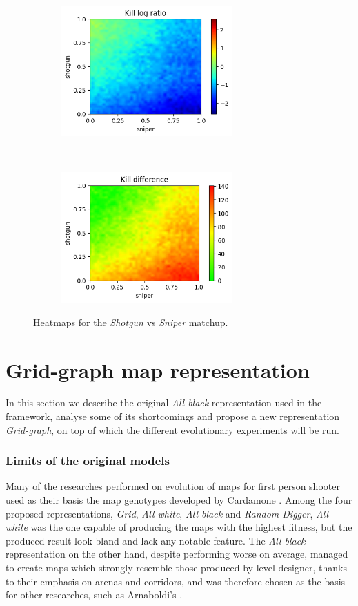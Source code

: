 \begin{figure}[H]
    \centering
    \begin{subfigure}[t]{0.5\textwidth}
        \centering
        \includegraphics[height=5cm]{Images/images/heatmaps/long-range/shotgun_sniper_heatmap_ratio.png}
    \end{subfigure}%
    ~ 
    \begin{subfigure}[t]{0.5\textwidth}
        \centering
        \includegraphics[height=5cm]{Images/images/heatmaps/long-range/shotgun_sniper_heatmap_diff.png}
    \end{subfigure}
    \caption{Heatmaps for the \textit{Shotgun} vs \textit{Sniper} matchup.}
    \label{fig:balance_shotgun_sniper_long}
    \label{fig:end_balance_heatmaps}
\end{figure}

\section{Grid-graph map representation}
In this section we describe the original \textit{All-black} representation used in the framework, analyse some of its shortcomings and propose a new representation \textit{Grid-graph}, on top of which the different evolutionary experiments will be run.

\subsubsection{Limits of the original models}
Many of the researches performed on evolution of maps for first person shooter used as their basis the map genotypes developed by Cardamone \citep{cardamone_evolving_maps}. Among the four proposed representations, \textit{Grid}, \textit{All-white}, \textit{All-black} and \textit{Random-Digger}, \textit{All-white} was the one capable of producing the maps with the highest fitness, but the produced result look bland and lack any notable feature.
The \textit{All-black} representation on the other hand, despite performing worse on average, managed to create maps which strongly resemble those produced by level designer, thanks to their emphasis on arenas and corridors, and was therefore chosen as the basis for other researches, such as Arnaboldi's \citep{arnaboldi_framework}. 

